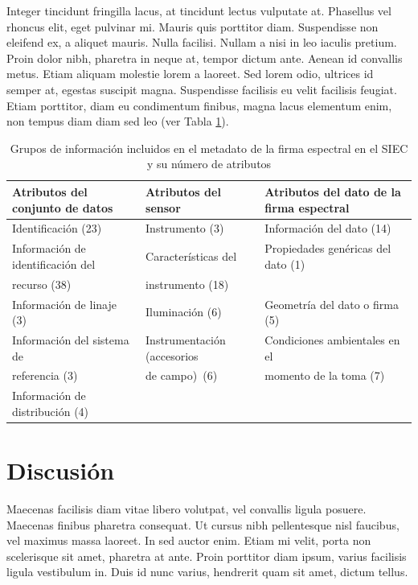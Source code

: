 \documentclass[artMGITG,SIG,accept,moreauthors,font4]{mgitg}%
\begin{document}
Integer tincidunt fringilla lacus, at tincidunt lectus vulputate at. Phasellus vel rhoncus elit, eget pulvinar mi. Mauris quis porttitor diam. Suspendisse non eleifend ex, a aliquet mauris. Nulla facilisi. Nullam a nisi in leo iaculis pretium. Proin dolor nibh, pharetra in neque at, tempor dictum ante. Aenean id convallis metus. Etiam aliquam molestie lorem a laoreet. Sed lorem odio, ultrices id semper at, egestas suscipit magna. Suspendisse facilisis eu velit facilisis feugiat. Etiam porttitor, diam eu condimentum finibus, magna lacus elementum enim, non tempus diam diam sed leo (ver Tabla \ref{tab1}). 

\begin{table}[!ht]
    
    \centering
        \caption{Grupos de información incluidos en el metadato de la firma espectral en el SIEC y su número de atributos}
    \begin{tabular}{lll}
    \toprule
    Atributos del conjunto de datos & Atributos del sensor & Atributos del dato de la firma espectral\\
    \midrule
    Identificación (23)  & Instrumento (3) & Información del dato (14)\\[10pt]
    Información de identificación del & Características del & Propiedades genéricas del dato (1)\\
    recurso (38) & instrumento (18) & \\[10pt]
    Información de linaje (3)	& Iluminación (6) & Geometría del dato o firma (5)\\[10pt]
    Información del sistema de & Instrumentación (accesorios  & Condiciones ambientales en el\\
    referencia (3)  & de campo)~(6) &  momento de la toma (7)\\[10pt]
    Información de distribución (4)	& & \\
    \bottomrule
    \end{tabular}
    \label{tab1}
\end{table}




\section{Discusión}
%
\noindent
Maecenas facilisis diam vitae libero volutpat, vel convallis ligula posuere. Maecenas finibus pharetra consequat. Ut cursus nibh pellentesque nisl faucibus, vel maximus massa laoreet. In sed auctor enim. Etiam mi velit, porta non scelerisque sit amet, pharetra at ante. Proin porttitor diam ipsum, varius facilisis ligula vestibulum in. Duis id nunc varius, hendrerit quam sit amet, dictum tellus.
\end{document}
